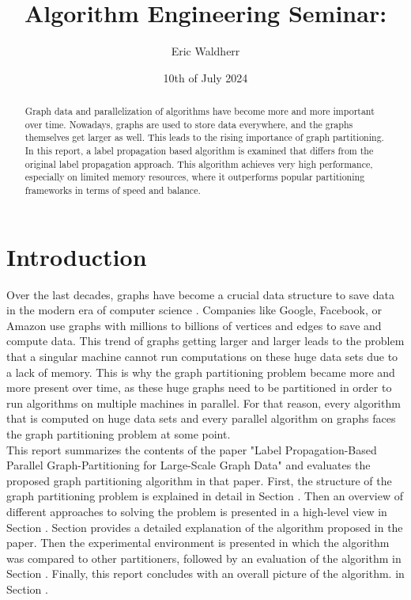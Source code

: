 \documentclass[acmsmall,nonacm,screen,review]{acmart}
\title{Algorithm Engineering Seminar: }
\author{Eric Waldherr}
\affiliation{%
  \institution{Heidelberg University}
  \streetaddress{Im Neuenheimer Feld 205}
  \city{Heidelberg}
  \state{Baden-Württemberg}
  \country{Germany}
  \postcode{69120}
}
\date{10th of July 2024}
\begin{document}
\begin{abstract}
Graph data and parallelization of algorithms have become more and more important over time. Nowadays, graphs are used to store data everywhere, and the graphs themselves get larger as well. This leads to the rising importance of graph partitioning. In this report, a label propagation based algorithm is examined that differs from the original label propagation approach. This algorithm achieves very high performance, especially on limited memory resources, where it outperforms popular partitioning frameworks in terms of speed and balance.
\end{abstract}
\maketitle

\section{Introduction}
Over the last decades, graphs have become a crucial data structure to save data in the modern era of computer science \cite{Junghanns2017}. Companies like Google, Facebook, or Amazon use graphs with millions to billions of vertices and edges to save and compute data. This trend of graphs getting larger and larger leads to the problem that a singular machine cannot run computations on these huge data sets due to a lack of memory. This is why the graph partitioning problem became more and more present over time, as these huge graphs need to be partitioned in order to run algorithms on multiple machines in parallel. For that reason, every algorithm that is computed on huge data sets and every parallel algorithm on graphs faces the graph partitioning problem at some point. \\
This report summarizes the contents of the paper "Label Propagation-Based Parallel Graph-Partitioning for Large-Scale Graph Data" \cite{Main} and evaluates the proposed graph partitioning algorithm in that paper. First, the structure of the graph partitioning problem is explained in detail in Section . Then an overview of different approaches to solving the problem is presented in a high-level view in Section . Section  provides a detailed explanation of the algorithm proposed in the paper. Then the experimental environment is presented in which the algorithm was compared to other partitioners, followed by an evaluation of the algorithm in Section . Finally, this report concludes with an overall picture of the algorithm. in Section .
\end{document}
